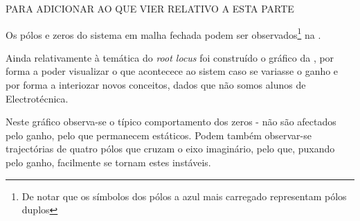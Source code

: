 \documentclass[%
  reprint,
  nofootinbib,
  amsmath,amssymb,
  aps,
  10pt,
  a4paper
]{revtex4-1}
\begin{document}
\par PARA ADICIONAR AO QUE VIER RELATIVO A ESTA PARTE
\par Os pólos e zeros do sistema em malha fechada podem ser observados\footnote{De notar que os símbolos dos pólos a azul mais carregado representam pólos duplos} na . 

\par Ainda relativamente à temática do \textit{root locus} foi construído o gráfico da , por forma a poder visualizar o que acontecece ao sistem caso se variasse o ganho e por forma a interiozar novos conceitos, dados que não somos alunos de Electrotécnica.


Neste gráfico observa-se o típico comportamento dos zeros - não são afectados pelo ganho, pelo que permanecem estáticos. Podem também observar-se trajectórias de quatro pólos que cruzam o eixo imaginário, pelo que, puxando pelo ganho, facilmente se tornam estes instáveis. 
\end{document}
